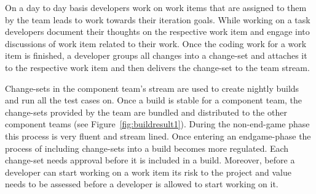 On a day to day basis developers work on work items that are assigned to them by the team leads to work towards their iteration goals.
While working on a task developers document their thoughts on the respective work item and engage into discussions of work item related to their work.
Once the coding work for a work item is finished, a developer groups all changes into a change-set and attaches it to the respective work item and then delivers the change-set to the team stream.

Change-sets in the component team's stream are used to create nightly builds and run all the test cases on.
Once a build is stable for a component team, the change-sets provided by the team are bundled and distributed to the other component teams (see Figure~\ref{fig:buildresult1}).
During the non-end-game phase this process is very fluent and stream lined.
Once entering an endgame-phase the process of including change-sets into a build becomes more regulated.
Each change-set needs approval before it is included in a build.
Moreover, before a developer can start working on a work item its risk to the project and value needs to be assessed before a developer is allowed to start working on it.

